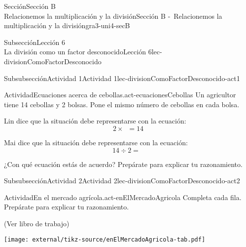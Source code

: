 \begin{sectionptx}{Sección}{{\Large Sección B\\}Relacionemos la multiplicación y la división}{}{Sección B -~Relacionemos la multiplicación y la división}{}{}{gra3-uni4-secB}
\begin{subsectionptx}{Subsección}{{\normalsize Lección 6\\[-0.05cm]}La división como un factor desconocido}{}{Lección 6}{}{}{lec-divisionComoFactorDesconocido}
\begin{multicols}{2}
\begin{subsubsectionptx}{Subsubsección}{Actividad 1}{}{Actividad 1}{}{}{lec-divisionComoFactorDesconocido-act1}
\begin{activity}{Actividad}{Ecuaciones acerca de cebollas.}{act-ecuacionesCebollas}%
Un agricultor tiene 14 cebollas y 2 bolsas. Pone el mismo número de cebollas en cada bolsa.%
\par
Lin dice que la situación debe representarse con la ecuación:%
\begin{equation*}
2 \times \boxed{\phantom{3}} = 14
\end{equation*}
%
\par
Mai dice que la situación debe representarse con la ecuación:%
\begin{equation*}
14 \div 2 = \boxed{\phantom{3}}
\end{equation*}
%
\par
¿Con qué ecuación estás de acuerdo? Prepárate para explicar tu razonamiento.%
\end{activity}%
\end{subsubsectionptx}
%
%
\typeout{************************************************}
\typeout{************************************************}
%
\vfill\columnbreak
\begin{subsubsectionptx}{Subsubsección}{Actividad 2}{}{Actividad 2}{}{}{lec-divisionComoFactorDesconocido-act2}
\begin{activity}{Actividad}{En el mercado agrícola.}{act-enElMercadoAgricola}%
Completa cada fila. Prepárate para explicar tu razonamiento.%
\par
(Ver libro de trabajo)
\begin{image}{0}{1}{0}{}%
\texttt{[image: external/tikz-source/enElMercadoAgricola-tab.pdf]}
\end{image}%
\end{activity}%
\end{subsubsectionptx}
\end{multicols}
%
%
\typeout{************************************************}
\typeout{************************************************}
%
\vspace{-2ex}

\end{subsectionptx}
\end{sectionptx}
